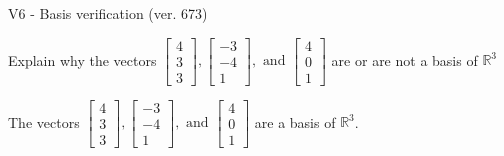 \begin{exercise}
  \begin{exerciseTitle}V6 - Basis verification (ver. 673)\end{exerciseTitle}
  \begin{exerciseStatement}
    Explain why the vectors \(\left[\begin{array}{r}
4 \\
3 \\
3
\end{array}\right] , \left[\begin{array}{r}
-3 \\
-4 \\
1
\end{array}\right] , \text{ and } \left[\begin{array}{r}
4 \\
0 \\
1
\end{array}\right]\) are or are not a basis of \(\mathbb{R}^3\)	


  \end{exerciseStatement}
  \begin{exerciseAnswer}
   The vectors \(\left[\begin{array}{r}
4 \\
3 \\
3
\end{array}\right] , \left[\begin{array}{r}
-3 \\
-4 \\
1
\end{array}\right] , \text{ and } \left[\begin{array}{r}
4 \\
0 \\
1
\end{array}\right]\) 
  	 are  a basis of \(\mathbb{R}^3\).
  


  \end{exerciseAnswer}
\end{exercise}